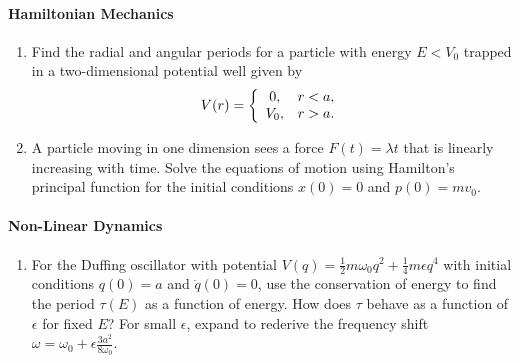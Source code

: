 \documentclass[letterpaper,11pt]{article}
\begin{document}
\paragraph*{Hamiltonian Mechanics}
\begin{enumerate}[resume]
 \item Find the radial and angular periods for a particle with energy $E < V_0$ trapped in a two-dimensional potential well given by
 \begin{equation*}
  V(r) = \left\{
  \begin{array}{c l}
   0, & r < a, \\
   V_0, & r > a.
  \end{array}
  \right.
 \end{equation*}
 \item A particle moving in one dimension sees a force $F(t) = \lambda t$ that is linearly increasing with time.  Solve the equations of motion using Hamilton's principal function for the initial conditions $x(0) = 0$ and $p(0) = mv_0$.
\end{enumerate}

\paragraph*{Non-Linear Dynamics}
\begin{enumerate}[resume]
 \item For the Duffing oscillator with potential $V(q) = \frac{1}{2} m \omega_0 q^2 + \frac{1}{4} m \epsilon q^4$ with initial conditions $q(0) = a$ and $\dot{q}(0) = 0$, use the conservation of energy to find the period $\tau(E)$ as a function of energy.  How does $\tau$ behave as a function of $\epsilon$ for fixed $E$?  For small $\epsilon$, expand to rederive the frequency shift $\omega = \omega_0 + \epsilon \frac{3a^2}{8\omega_0}$.
\end{enumerate}
\end{document}
